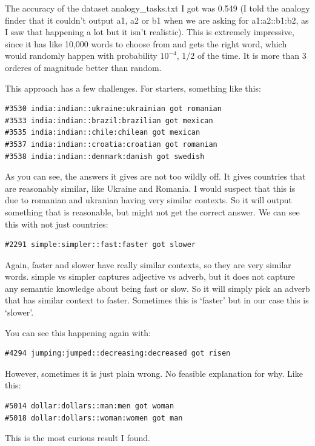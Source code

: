 \documentclass[12pt]{article}
\theoremstyle{definitionstyle}
\begin{document}
\begin{enumerate}[leftmargin=\labelsep]
\begin{enumerate}[label=\textbf{(\alph*)}]
                 The accuracy of the dataset analogy\_tasks.txt I got was 0.549 (I told the analogy finder that it couldn't output a1, a2 or b1 when we are asking for a1:a2::b1:b2, as I saw that happening a lot but it isn't realistic). This is extremely impressive, since it has like 10,000 words to choose from and gets the right word, which would randomly happen with probability $10^{-4}$, 1/2 of the time. It is more than 3 orderes of magnitude better than random.

                 This approach has a few challenges. For starters, something like this:
                 \begin{lstlisting}
#3530 india:indian::ukraine:ukrainian got romanian
#3533 india:indian::brazil:brazilian got mexican
#3535 india:indian::chile:chilean got mexican
#3537 india:indian::croatia:croatian got romanian
#3538 india:indian::denmark:danish got swedish
                 \end{lstlisting}
                 As you can see, the answers it gives are not too wildly off. It gives countries that are reasonably similar, like Ukraine and Romania. I would suspect that this is due to romanian and ukranian having very similar contexts. So it will output something that is reasonable, but might not get the correct answer. We can see this with not just countries:
                 \begin{lstlisting}
#2291 simple:simpler::fast:faster got slower
                 \end{lstlisting}
                 Again, faster and slower have really similar contexts, so they are very similar words. simple vs simpler captures adjective vs adverb, but it does not capture any semantic knowledge about being fast or slow. So it will simply pick an adverb that has similar context to faster. Sometimes this is `faster' but in our case this is `slower'. 

                 You can see this happening again with:
                 \begin{lstlisting}
#4294 jumping:jumped::decreasing:decreased got risen
                 \end{lstlisting}

                 However, sometimes it is just plain wrong. No feasible explanation for why. Like this:
                 \begin{lstlisting}
#5014 dollar:dollars::man:men got woman
#5018 dollar:dollars::woman:women got man
                 \end{lstlisting}
                 This is the most curious result I found. 


\end{enumerate}
\end{enumerate}
\end{document}
